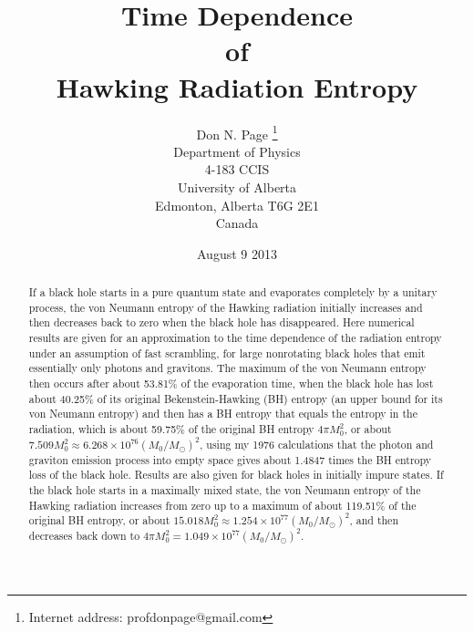 \documentclass[12pt]{article}
\begin{document}
\title{{\bf Time Dependence\\ of\\ Hawking Radiation Entropy}}

\author{
Don N. Page
\thanks{Internet address:
profdonpage@gmail.com}
\\
Department of Physics\\
4-183 CCIS\\
University of Alberta\\
Edmonton, Alberta T6G 2E1\\
Canada
}

\date{August 9 2013}

\maketitle
\begin{abstract}

If a black hole starts in a pure quantum state and evaporates completely by a unitary process, the von Neumann entropy of the Hawking radiation initially increases and then decreases back to zero when the black hole has disappeared.  Here numerical results are given for an approximation to the time dependence of the radiation entropy under an assumption of fast scrambling, for large nonrotating black holes that emit essentially only photons and gravitons.  The maximum of the von Neumann entropy then occurs after about 53.81\% of the evaporation time, when the black hole has lost about 40.25\% of its original Bekenstein-Hawking (BH) entropy (an upper bound for its von Neumann entropy) and then has a BH entropy that equals the entropy in the radiation, which is about 59.75\% of the original BH entropy $4\pi M_0^2$, or about $7.509 M_0^2 \approx 6.268\times 10^{76}(M_0/M_\odot)^2$, using my 1976 calculations that the photon and graviton emission process into empty space gives about 1.4847 times the BH entropy loss of the black hole. Results are also given for black holes in initially impure states.  If the black hole starts in a maximally mixed state, the von Neumann entropy of the Hawking radiation increases from zero up to a maximum of about 119.51\% of the original BH entropy, or about $15.018 M_0^2 \approx 1.254\times 10^{77}(M_0/M_\odot)^2$, and then decreases back down to $4\pi M_0^2 = 1.049\times 10^{77}(M_0/M_\odot)^2$.

\end{abstract}

\normalsize
\newpage
\end{document}
